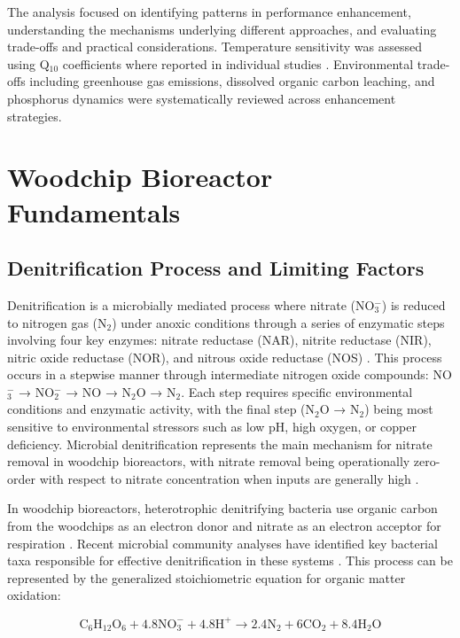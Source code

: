 \documentclass[12pt,a4paper]{article}
\begin{document}
The analysis focused on identifying patterns in performance enhancement, understanding the mechanisms underlying different approaches, and evaluating trade-offs and practical considerations. Temperature sensitivity was assessed using Q$_{10}$ coefficients where reported in individual studies \citep{RN242, RN258}. Environmental trade-offs including greenhouse gas emissions, dissolved organic carbon leaching, and phosphorus dynamics were systematically reviewed across enhancement strategies.

\section{Woodchip Bioreactor Fundamentals}

\subsection{Denitrification Process and Limiting Factors}

Denitrification is a microbially mediated process where nitrate (NO$_{3}^{-}$) is reduced to nitrogen gas (N$_{2}$) under anoxic conditions through a series of enzymatic steps involving four key enzymes: nitrate reductase (NAR), nitrite reductase (NIR), nitric oxide reductase (NOR), and nitrous oxide reductase (NOS) \citep{RN242, RN629}. This process occurs in a stepwise manner through intermediate nitrogen oxide compounds: NO$_{3}^{-}$ → NO$_{2}^{-}$ → NO → N$_{2}$O → N$_{2}$. Each step requires specific environmental conditions and enzymatic activity, with the final step (N$_{2}$O → N$_{2}$) being most sensitive to environmental stressors such as low pH, high oxygen, or copper deficiency. Microbial denitrification represents the main mechanism for nitrate removal in woodchip bioreactors, with nitrate removal being operationally zero-order with respect to nitrate concentration when inputs are generally high \citep{RN625, RN242}.

In woodchip bioreactors, heterotrophic denitrifying bacteria use organic carbon from the woodchips as an electron donor and nitrate as an electron acceptor for respiration \citep{RN242, RN725}. Recent microbial community analyses have identified key bacterial taxa responsible for effective denitrification in these systems \citep{RN239, RN1185}. This process can be represented by the generalized stoichiometric equation for organic matter oxidation:

\begin{equation}
\text{C}_6\text{H}_{12}\text{O}_6 + 4.8\text{NO}_{3}^{-} + 4.8\text{H}^{+} \rightarrow 2.4\text{N}_{2} + 6\text{CO}_{2} + 8.4\text{H}_{2}\text{O}
\end{equation}
\end{document}
